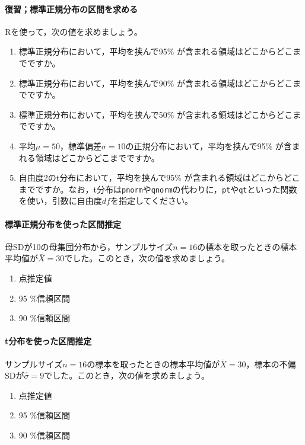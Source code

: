 \documentclass{ltjsbook}
\begin{document}
\paragraph{復習；標準正規分布の区間を求める}
Rを使って，次の値を求めましょう。
\begin{enumerate}
	\item 標準正規分布において，平均を挟んで95\% が含まれる領域はどこからどこまでですか。
	\item 標準正規分布において，平均を挟んで90\% が含まれる領域はどこからどこまでですか。
	\item 標準正規分布において，平均を挟んで50\% が含まれる領域はどこからどこまでですか。
	\item 平均$\mu=50$，標準偏差$\sigma = 10$の正規分布において，平均を挟んで95\% が含まれる領域はどこからどこまでですか。
	\item 自由度2のt分布において，平均を挟んで95\% が含まれる領域はどこからどこまでですか。なお，t分布は\texttt{pnorm}や\texttt{qnorm}の代わりに，\texttt{pt}や\texttt{qt}といった関数を使い，引数に自由度$df$を指定してください。
\end{enumerate}

\paragraph{標準正規分布を使った区間推定}
母SDが10の母集団分布から，サンプルサイズ$n=16$の標本を取ったときの標本平均値が$\bar{X}=30$でした。このとき，次の値を求めましょう。
\begin{enumerate}
	\item 点推定値
	\item 95 \%信頼区間
	\item 90 \%信頼区間
\end{enumerate}

\paragraph{t分布を使った区間推定}
サンプルサイズ$n=16$の標本を取ったときの標本平均値が$\bar{X}=30$，標本の不偏SDが$\hat{\sigma}=9$でした。このとき，次の値を求めましょう。
\begin{enumerate}
	\item 点推定値
	\item 95 \%信頼区間
	\item 90 \%信頼区間
\end{enumerate}
\end{document}
